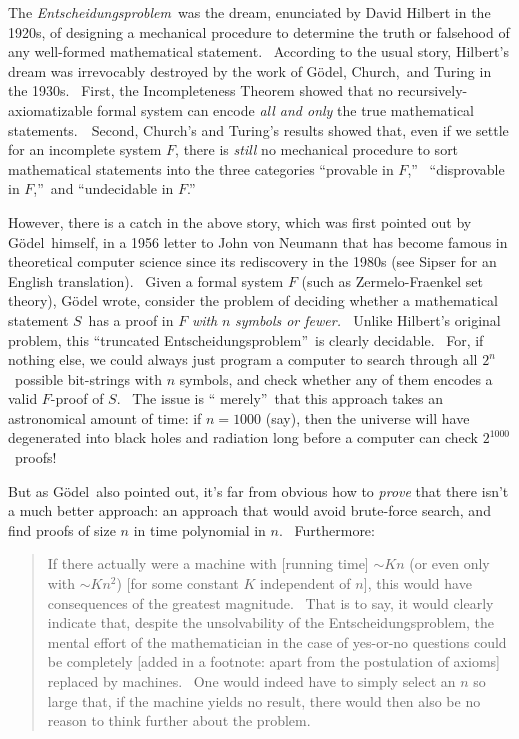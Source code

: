 \documentclass[12pt,onecolumn]{article}%
\begin{document}
The \textit{Entscheidungsproblem}\ was the dream, enunciated by David Hilbert
in the 1920s, of designing a mechanical procedure to determine the truth or
falsehood of any well-formed mathematical statement. \ According to the usual
story, Hilbert's dream was irrevocably destroyed by the work of G\"{o}del,
Church,\ and Turing in the 1930s. \ First, the Incompleteness Theorem showed
that no recursively-axiomatizable formal system can encode \textit{all and
only} the true mathematical statements.\ \ Second, Church's and Turing's
results showed that, even if we settle for an incomplete system $F$, there is
\textit{still} no mechanical procedure to sort mathematical statements into
the three categories \textquotedblleft provable in $F$,\textquotedblright%
\ \textquotedblleft disprovable in $F$,\textquotedblright\ and
\textquotedblleft undecidable in $F$.\textquotedblright

However, there is a catch in the above story, which was first pointed out by
G\"{o}del\ himself, in a 1956 letter to John von Neumann that has become
famous in theoretical computer science since its rediscovery in the 1980s (see
Sipser \cite{sipser:pnp} for an English translation). \ Given a formal system
$F$ (such as Zermelo-Fraenkel set theory), G\"{o}del wrote, consider the
problem of deciding whether a mathematical statement $S$\ has a proof in $F$
\textit{with }$n$\textit{ symbols or fewer. \ }Unlike Hilbert's original
problem, this \textquotedblleft truncated
Entscheidungsproblem\textquotedblright\ is clearly decidable. \ For, if
nothing else, we could always just program a computer to search through all
$2^{n}$\ possible bit-strings with $n$ symbols, and check whether any of them
encodes a valid $F$-proof of $S$. \ The issue is \textquotedblleft
merely\textquotedblright\ that this approach takes an astronomical amount of
time: if $n=1000$ (say), then the universe will have degenerated into black
holes and radiation long before a computer can check $2^{1000}$\ proofs!

But as G\"{o}del\ also pointed out, it's far from obvious how to
\textit{prove} that there isn't a much better approach: an approach that would
avoid brute-force search, and find proofs of size $n$ in time polynomial in
$n$. \ Furthermore:

\begin{quotation}
\noindent If there actually were a machine with [running time] $\sim Kn$ (or
even only with $\sim Kn^{2}$) [for some constant $K$ independent of $n$], this
would have consequences of the greatest magnitude. \ That is to say, it would
clearly indicate that, despite the unsolvability of the Entscheidungsproblem,
the mental effort of the mathematician in the case of yes-or-no questions
could be completely [added in a footnote: apart from the postulation of
axioms] replaced by machines. \ One would indeed have to simply select an $n$
so large that, if the machine yields no result, there would then also be no
reason to think further about the problem.
\end{quotation}
\end{document}
